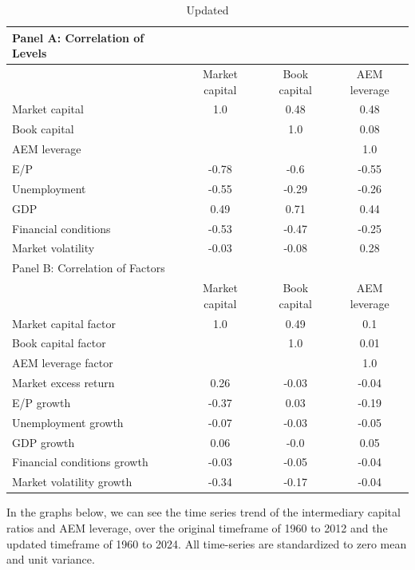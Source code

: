 \documentclass{article}
\begin{document}
    \begin{table}[htbp]
    \centering
    \caption{\label{tab:correlation}Updated}
    \begin{adjustbox}{max width=\textwidth}
    \small
    \begin{tabular}{lccc}
        \toprule
        Panel A: Correlation of Levels \\
        \midrule
         & Market capital & Book capital & AEM leverage \\
        \midrule
        Market capital & 1.0 & 0.48 & 0.48 \\
Book capital &  & 1.0 & 0.08 \\
AEM leverage &  &  & 1.0 \\
E/P & -0.78 & -0.6 & -0.55 \\
Unemployment & -0.55 & -0.29 & -0.26 \\
GDP & 0.49 & 0.71 & 0.44 \\
Financial conditions & -0.53 & -0.47 & -0.25 \\
Market volatility & -0.03 & -0.08 & 0.28 \\
        \midrule
        Panel B: Correlation of Factors \\
        \midrule
         & Market capital & Book capital & AEM leverage \\
        \midrule
        Market capital factor & 1.0 & 0.49 & 0.1 \\
Book capital factor &  & 1.0 & 0.01 \\
AEM leverage factor &  &  & 1.0 \\
Market excess return & 0.26 & -0.03 & -0.04 \\
E/P growth & -0.37 & 0.03 & -0.19 \\
Unemployment growth & -0.07 & -0.03 & -0.05 \\
GDP growth & 0.06 & -0.0 & 0.05 \\
Financial conditions growth & -0.03 & -0.05 & -0.04 \\
Market volatility growth & -0.34 & -0.17 & -0.04 \\
        \bottomrule
    \end{tabular}
    \end{adjustbox}
    \end{table}
    
\clearpage

In the graphs below, we can see the time series trend of the intermediary capital ratios and AEM leverage, over the original timeframe of 1960 to 2012 and the updated timeframe of 1960 to 2024. All time-series are standardized to zero mean and unit variance.
\end{document}

